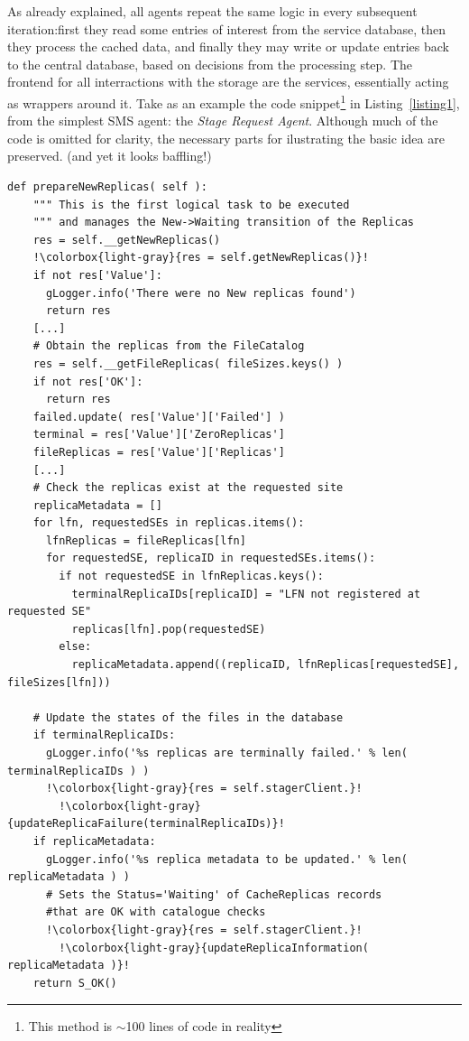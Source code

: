 \documentclass[10pt,conference]{IEEEtran}
\begin{document}
As already explained, all agents repeat the same logic in every subsequent iteration:first they
read some entries of interest from the service database, then they process the cached data, and finally
they may write or update entries back to the central database, based on decisions from the processing step.
The frontend for all interractions with the storage are the services, essentially acting as wrappers around it.
Take as an example the code snippet\footnote{This method is $\sim$100 lines of code in reality} 
in Listing~\ref{listing1}, 
from the simplest SMS agent: the \textit{Stage Request Agent}. 
Although much of the code is omitted for clarity, the necessary parts for ilustrating the basic idea are preserved.
 (and yet it looks baffling!)



\begin{lstlisting}[float=tp,escapechar=!,basicstyle=\ttfamily\fontsize{7}{7}\selectfont]
  def prepareNewReplicas( self ):
    """ This is the first logical task to be executed 
    """ and manages the New->Waiting transition of the Replicas
    res = self.__getNewReplicas()
    !\colorbox{light-gray}{res = self.getNewReplicas()}!
    if not res['Value']:
      gLogger.info('There were no New replicas found')
      return res
    [...]
    # Obtain the replicas from the FileCatalog
    res = self.__getFileReplicas( fileSizes.keys() )
    if not res['OK']:
      return res
    failed.update( res['Value']['Failed'] )
    terminal = res['Value']['ZeroReplicas']
    fileReplicas = res['Value']['Replicas']
    [...]
    # Check the replicas exist at the requested site
    replicaMetadata = []
    for lfn, requestedSEs in replicas.items():
      lfnReplicas = fileReplicas[lfn]
      for requestedSE, replicaID in requestedSEs.items():
        if not requestedSE in lfnReplicas.keys():
          terminalReplicaIDs[replicaID] = "LFN not registered at requested SE"
          replicas[lfn].pop(requestedSE)
        else:
          replicaMetadata.append((replicaID, lfnReplicas[requestedSE], fileSizes[lfn]))

    # Update the states of the files in the database
    if terminalReplicaIDs:
      gLogger.info('%s replicas are terminally failed.' % len( terminalReplicaIDs ) )
      !\colorbox{light-gray}{res = self.stagerClient.}!
	    !\colorbox{light-gray}{updateReplicaFailure(terminalReplicaIDs)}!
    if replicaMetadata:
      gLogger.info('%s replica metadata to be updated.' % len( replicaMetadata ) )
      # Sets the Status='Waiting' of CacheReplicas records 
      #that are OK with catalogue checks
      !\colorbox{light-gray}{res = self.stagerClient.}!
	    !\colorbox{light-gray}{updateReplicaInformation( replicaMetadata )}!
    return S_OK()

\end{lstlisting}
\end{document}
